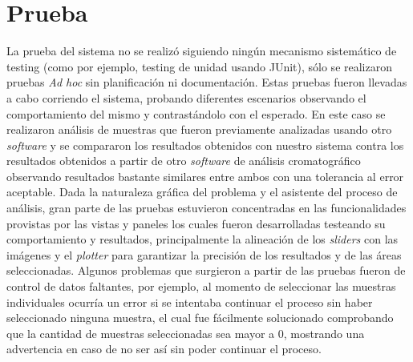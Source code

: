\section{Prueba}
La prueba del sistema no se realiz\'o siguiendo ning\'un mecanismo sistem\'atico de testing (como por ejemplo, testing de unidad usando JUnit), s\'olo se realizaron pruebas \textit{Ad hoc} sin planificaci\'on ni documentaci\'on. Estas pruebas fueron llevadas a cabo corriendo el sistema, probando diferentes escenarios observando el comportamiento del mismo y contrast\'andolo con el esperado. En este caso se realizaron an\'alisis de muestras que fueron previamente analizadas usando otro \textit{software} y se compararon los resultados obtenidos con nuestro sistema contra los resultados obtenidos a partir de otro \textit{software} de an\'alisis cromatogr\'afico observando resultados bastante similares entre ambos con una tolerancia al error aceptable. Dada la naturaleza gr\'afica del problema y el asistente del proceso de an\'alisis, gran parte de las pruebas estuvieron concentradas en las funcionalidades provistas por las vistas y paneles los cuales fueron desarrolladas testeando su comportamiento y resultados, principalmente la alineaci\'on de los \textit{sliders} con las im\'agenes y el \textit{plotter} para garantizar la precisi\'on de los resultados y de las \'areas seleccionadas. Algunos problemas que surgieron a partir de las pruebas fueron de control de datos faltantes, por ejemplo, al momento de seleccionar las muestras individuales ocurr\'ia un error si se intentaba continuar el proceso sin haber seleccionado ninguna muestra, el cual fue f\'acilmente solucionado comprobando que la cantidad de muestras seleccionadas sea mayor a 0, mostrando una advertencia en caso de no ser as\'i sin poder continuar el proceso.

